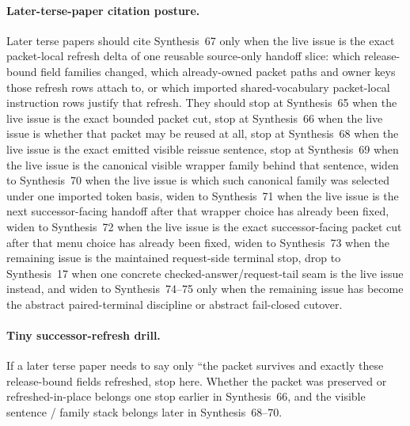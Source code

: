 \documentclass[11pt]{article}
\begin{document}
\paragraph{Later-terse-paper citation posture.}
Later terse papers should cite Synthesis~67 only when the live issue is the exact packet-local refresh delta of one reusable source-only handoff slice: which release-bound field families changed, which already-owned packet paths and owner keys those refresh rows attach to, or which imported shared-vocabulary packet-local instruction rows justify that refresh. They should stop at Synthesis~65 when the live issue is the exact bounded packet cut, stop at Synthesis~66 when the live issue is whether that packet may be reused at all, stop at Synthesis~68 when the live issue is the exact emitted visible reissue sentence, stop at Synthesis~69 when the live issue is the canonical visible wrapper family behind that sentence, widen to Synthesis~70 when the live issue is which such canonical family was selected under one imported token basis, widen to Synthesis~71 when the live issue is the next successor-facing handoff after that wrapper choice has already been fixed, widen to Synthesis~72 when the live issue is the exact successor-facing packet cut after that menu choice has already been fixed, widen to Synthesis~73 when the remaining issue is the maintained request-side terminal stop, drop to Synthesis~17 when one concrete checked-answer/request-tail seam is the live issue instead, and widen to Synthesis~74--75 only when the remaining issue has become the abstract paired-terminal discipline or abstract fail-closed cutover.\cite{series:publicrequestresponsepackets,series:publicrequestresponsepacketcarryforward,series:publicrequestresponsepacketrefreshnotices,series:publicrequestresponsepacketrefreshnormalforms,series:publicrequestresponsepacketrefreshselections,series:publicrequestresponsepacketrefreshresponsemenus,series:publicrequestresponsepacketrefreshresponsepackets,series:publicrequestresponsepacketrefreshresponsepacketclosureverdicts,series:pairedterminalcitationdiscipline,series:pairedterminalcutoverrule,series:workedexample}

\paragraph{Tiny successor-refresh drill.}
If a later terse paper needs to say only ``the packet survives and exactly these release-bound fields refreshed, stop here. Whether the packet was preserved or refreshed-in-place belongs one stop earlier in Synthesis~66, and the visible sentence / family stack belongs later in Synthesis~68--70.
\end{document}
